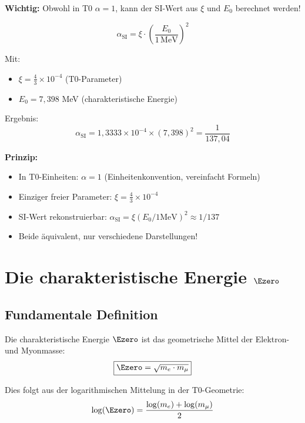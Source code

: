 	\textbf{Wichtig:} Obwohl in T0 $\alpha = 1$, kann der SI-Wert aus $\xi$ und $E_0$ berechnet werden!
	
	\begin{equation}
		\boxed{\alpha_{\text{SI}} = \xi \cdot \left(\frac{E_0}{1\,\text{MeV}}\right)^2}
	\end{equation}
	
	Mit:
	\begin{itemize}
		\item $\xi = \frac{4}{3} \times 10^{-4}$ (T0-Parameter)
		\item $E_0 = 7{,}398$ MeV (charakteristische Energie)
	\end{itemize}
	
	Ergebnis:
	\begin{equation}
		\alpha_{\text{SI}} = 1{,}3333 \times 10^{-4} \times (7{,}398)^2 = \frac{1}{137{,}04}
	\end{equation}
	
	\textbf{Prinzip:} 
	\begin{itemize}
		\item In T0-Einheiten: $\alpha = 1$ (Einheitenkonvention, vereinfacht Formeln)
		\item Einziger freier Parameter: $\xi = \frac{4}{3} \times 10^{-4}$
		\item SI-Wert rekonstruierbar: $\alpha_{\text{SI}} = \xi(E_0/1\text{MeV})^2 \approx 1/137$
		\item Beide äquivalent, nur verschiedene Darstellungen!
	\end{itemize}
	
	\section[Die charakteristische Energie E0]{Die charakteristische Energie $\Ezero$}
	
	\subsection{Fundamentale Definition}
	
	Die charakteristische Energie $\Ezero$ ist das geometrische Mittel der Elektron- und Myonmasse:
	\begin{equation}
		\boxed{\Ezero = \sqrt{m_e \cdot m_\mu}}
		\label{eq:E0_fundamental}
	\end{equation}
	
	Dies folgt aus der logarithmischen Mittelung in der T0-Geometrie:
	\begin{equation}
		\log(\Ezero) = \frac{\log(m_e) + \log(m_\mu)}{2}
		\label{eq:E0_logarithmic}
	\end{equation}
	
